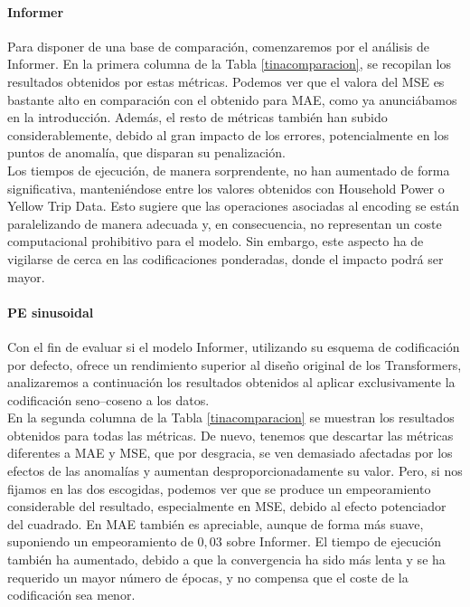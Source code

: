 \paragraph{Informer}

Para disponer de una base de comparación, comenzaremos por el análisis de Informer. En la primera columna de la Tabla \ref{tinacomparacion}, se recopilan los resultados obtenidos por estas métricas. Podemos ver que el valora del MSE es bastante alto en comparación con el obtenido para MAE, como ya anunciábamos en la introducción. Además, el resto de métricas también han subido considerablemente, debido al gran impacto de los errores, potencialmente en los puntos de anomalía, que disparan su penalización.\\

 Los tiempos de ejecución, de manera sorprendente, no han aumentado de forma significativa, manteniéndose entre los valores obtenidos con Household Power o Yellow Trip Data. Esto sugiere que las operaciones asociadas al encoding se están paralelizando de manera adecuada y, en consecuencia, no representan un coste computacional prohibitivo para el modelo. Sin embargo, este aspecto ha de vigilarse de cerca en las codificaciones ponderadas, donde el impacto podrá ser mayor.
 
\paragraph{PE sinusoidal}

Con el fin de evaluar si el modelo Informer, utilizando su esquema de codificación por defecto, ofrece un rendimiento superior al diseño original de los Transformers, analizaremos a continuación los resultados obtenidos al aplicar exclusivamente la codificación seno–coseno a los datos.\\

En la segunda columna de la Tabla \ref{tinacomparacion} se muestran los resultados obtenidos para todas las métricas. De nuevo, tenemos que descartar las métricas diferentes a MAE y MSE, que por desgracia, se ven demasiado afectadas por los efectos de las anomalías y aumentan desproporcionadamente su valor. Pero, si nos fijamos en las dos escogidas, podemos ver que se produce un empeoramiento considerable del resultado, especialmente en MSE, debido al efecto potenciador del cuadrado. En MAE también es apreciable, aunque de forma más suave, suponiendo un empeoramiento de $0,03$ sobre Informer. El tiempo de ejecución también ha aumentado, debido a que la convergencia ha sido más lenta y se ha requerido un mayor número de épocas, y no compensa que el coste de la codificación sea menor.

